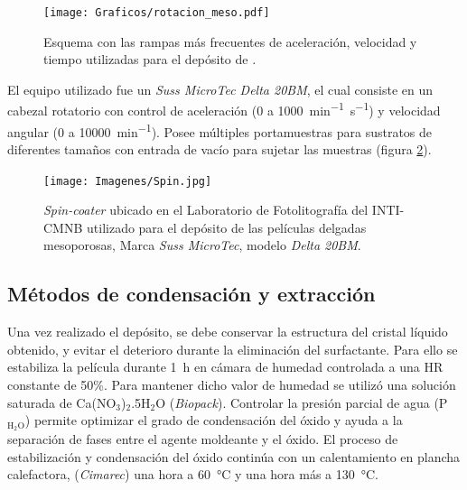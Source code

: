 			   		   \begin{figure}[!h]
						 \begin{center}
						 \texttt{[image: Graficos/rotacion\_meso.pdf]}
						 \caption[Parámetros de depósito para las \pdm]{Esquema con las rampas más frecuentes de aceleración, velocidad y tiempo utilizadas para el depósito de \pdm.}
						 \label{fig:rampa-spin}
						 \end{center}
						 \end{figure}
			
			 El equipo utilizado fue un \textit{Suss MicroTec Delta 20BM}, el cual consiste en un cabezal rotatorio con control de aceleración (0 a  \SI{1000}{\minute^{-1}.\second^{-1}}) y velocidad angular (0 a \SI{10000}{\minute^{-1}}). Posee múltiples portamuestras para sustratos de diferentes tamaños con entrada de vacío para sujetar las muestras (figura \ref{fig:spin}).   		   


				\begin{figure}[h!]
					  \begin{center}
					  \texttt{[image: Imagenes/Spin.jpg]}
					  \caption[Equipo para el depósito de películas delgadas, \textit{spin-coater}]{\textit{Spin-coater} ubicado en el Laboratorio de Fotolitografía del INTI-CMNB utilizado para el depósito de las películas delgadas mesoporosas, Marca \textit{Suss MicroTec}, modelo \textit{Delta 20BM}.}
					  \label{fig:spin}
					  \end{center}
					  \end{figure}
					
					

	\subsection{Métodos de condensación y extracción}\label{sec:cond_y_extr}

		Una vez realizado el depósito, se debe conservar la estructura del cristal líquido obtenido, y evitar el deterioro durante la eliminación del surfactante. Para ello se estabiliza la película durante \SI{1}{\hour} en cámara de humedad controlada a una HR constante de 50\%. Para mantener dicho valor de humedad se utilizó una solución saturada de Ca(NO$_3$)$_2$.5H$_2$O (\textit{Biopack}). Controlar la presión parcial de agua (P$_{\text{H}_2\text{O}}$) permite optimizar el grado de condensación del óxido y ayuda a la separación de fases entre el agente moldeante y el óxido\cite{Crepaldi2003}. El proceso de estabilización y condensación del óxido continúa con un calentamiento en plancha calefactora, (\textit{Cimarec}) una hora a \SI{60}{\celsius} y una hora más a \SI{130}{\celsius}\cite{Crepaldi2003,Crepaldi2002a}. 
				
